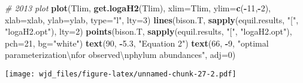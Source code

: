 \documentclass[]{article}
\newenvironment{Shaded}{\begin{snugshade}}{\end{snugshade}}
\newcommand{\KeywordTok}[1]{\textcolor[rgb]{0.13,0.29,0.53}{\textbf{#1}}}
\newcommand{\DataTypeTok}[1]{\textcolor[rgb]{0.13,0.29,0.53}{#1}}
\newcommand{\DecValTok}[1]{\textcolor[rgb]{0.00,0.00,0.81}{#1}}
\newcommand{\FloatTok}[1]{\textcolor[rgb]{0.00,0.00,0.81}{#1}}
\newcommand{\CharTok}[1]{\textcolor[rgb]{0.31,0.60,0.02}{#1}}
\newcommand{\StringTok}[1]{\textcolor[rgb]{0.31,0.60,0.02}{#1}}
\newcommand{\CommentTok}[1]{\textcolor[rgb]{0.56,0.35,0.01}{\textit{#1}}}
\newcommand{\OperatorTok}[1]{\textcolor[rgb]{0.81,0.36,0.00}{\textbf{#1}}}
\newcommand{\NormalTok}[1]{#1}
\begin{document}
\begin{Shaded}
\begin{Highlighting}[]
\CommentTok{# 2013 plot}
\KeywordTok{plot}\NormalTok{(Tlim, }\KeywordTok{get.logaH2}\NormalTok{(Tlim), }\DataTypeTok{xlim=}\NormalTok{Tlim, }\DataTypeTok{ylim=}\KeywordTok{c}\NormalTok{(}\OperatorTok{-}\DecValTok{11}\NormalTok{,}\OperatorTok{-}\DecValTok{2}\NormalTok{),}
\DataTypeTok{xlab=}\NormalTok{xlab, }\DataTypeTok{ylab=}\NormalTok{ylab, }\DataTypeTok{type=}\StringTok{"l"}\NormalTok{, }\DataTypeTok{lty=}\DecValTok{3}\NormalTok{)}
\KeywordTok{lines}\NormalTok{(bison.T, }\KeywordTok{sapply}\NormalTok{(equil.results, }\StringTok{"["}\NormalTok{, }\StringTok{"logaH2.opt"}\NormalTok{), }\DataTypeTok{lty=}\DecValTok{2}\NormalTok{)}
\KeywordTok{points}\NormalTok{(bison.T, }\KeywordTok{sapply}\NormalTok{(equil.results, }\StringTok{"["}\NormalTok{, }\StringTok{"logaH2.opt"}\NormalTok{), }\DataTypeTok{pch=}\DecValTok{21}\NormalTok{, }\DataTypeTok{bg=}\StringTok{"white"}\NormalTok{)}
\KeywordTok{text}\NormalTok{(}\DecValTok{90}\NormalTok{, }\OperatorTok{-}\FloatTok{5.3}\NormalTok{, }\StringTok{"Equation 2"}\NormalTok{)}
\KeywordTok{text}\NormalTok{(}\DecValTok{66}\NormalTok{, }\OperatorTok{-}\DecValTok{9}\NormalTok{, }\StringTok{"optimal parameterization}\CharTok{\textbackslash{}n}\StringTok{for observed}\CharTok{\textbackslash{}n}\StringTok{phylum abundances"}\NormalTok{, }\DataTypeTok{adj=}\DecValTok{0}\NormalTok{)}
\end{Highlighting}
\end{Shaded}

\texttt{[image: wjd\_files/figure-latex/unnamed-chunk-27-2.pdf]}
\end{document}
